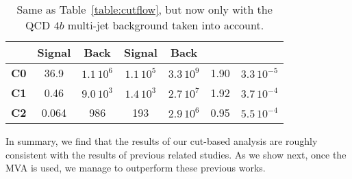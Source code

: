 \begin{table}[t]
\begin{tabular}{c|c|c|c|c|c|c}
      &    Signal & Back   &  Signal  & Back
    &   & \\
    \hline
 {\bf C0}  &  36.9  & $1.1\,10^{6}$ & $1.1\,10^5$ & $3.3\,10^{9}$  &  1.90 & $3.3\,10^{-5}$\\
        {\bf C1}  &  0.46    & $9.0\,10^3$    &  $1.4\,10^3$   & $2.7\,10^7$     & 1.92     &  $3.7\,10^{-4}$ \\
        {\bf C2}  &  0.064     &  986     &  193   &  $2.9\,10^6$    &  0.95  &  $5.5\,10^{-4}$ \\
        \hline
  \end{tabular}
  \caption{\small Same as Table~\ref{table:cutflow}, but now
    only with the QCD $4b$ multi-jet background taken into account.
    \label{table:cutflow4B}
  }
\end{table}


In summary, we find that the results of our cut-based analysis are roughly
consistent with the results of previous related studies.
%
As we show next, once the MVA is used, we manage to outperform these previous
works.

